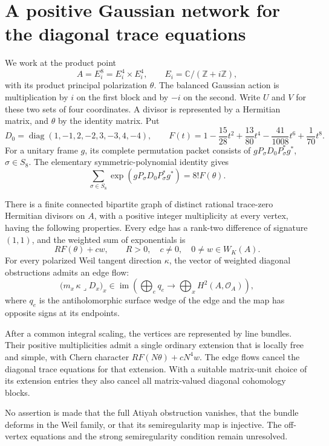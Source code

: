\section{A positive Gaussian network for the diagonal trace equations}
\label{sec:gaussian-trace-network}

We work at the product point
\[
 A=E_i^8=E_i^4\times E_i^4,
 \qquad E_i=\mathbb C/(\mathbb Z+i\mathbb Z),
\]
with its product principal polarization \(\theta\).  The balanced
Gaussian action is multiplication by \(i\) on the first block and by
\(-i\) on the second.  Write \(U\) and \(V\) for these two sets of four
coordinates.  A divisor is represented by a Hermitian matrix, and
\(\theta\) by the identity matrix.  Put
\[
 D_0=\operatorname{diag}(1,-1,2,-2,3,-3,4,-4),\qquad
 F(t)=1-\frac{15}{28}t^2+\frac{13}{80}t^4
       -\frac{41}{1008}t^6+\frac1{70}t^8.
\]
For a unitary frame \(g\), its complete permutation packet consists
of \(gP_\sigma D_0P_\sigma^*g^*\), \(\sigma\in S_8\).
The elementary symmetric-polynomial identity gives
\begin{equation}
 \sum_{\sigma\in S_8}
   \exp(gP_\sigma D_0P_\sigma^*g^*)=8!F(\theta).
 \label{eq:trace-packet-average}
\end{equation}

\begin{theorem}
\label{thm:gaussian-positive-trace-network}
There is a finite connected bipartite graph of distinct rational
trace-zero Hermitian divisors on \(A\), with a positive integer
multiplicity at every vertex, having the following properties.
Every edge has a rank-two difference of signature \((1,1)\), and
the weighted sum of exponentials is
\[
 R F(\theta)+c w,
 \qquad R>0,\quad c\ne0,\quad 0\ne w\in W_K(A).
\]
For every polarized Weil tangent direction \(\kappa\), the vector of
weighted diagonal obstructions admits an edge flow:
\begin{equation}
 \bigl(m_x\,\kappa\mathbin{\lrcorner}D_x\bigr)_x
 \in\operatorname{im}\left(
   \bigoplus_{e}q_e\longrightarrow\bigoplus_x H^2(A,\mathcal O_A)
 \right),
 \label{eq:positive-trace-flow}
\end{equation}
where \(q_e\) is the antiholomorphic surface wedge of the edge and
the map has opposite signs at its endpoints.

After a common integral scaling, the vertices are represented by
line bundles.  Their positive multiplicities admit a single ordinary
extension that is locally free and simple, with Chern character
\(R F(N\theta)+cN^4w\).  The edge flows cancel the diagonal trace
equations for that extension.  With a suitable matrix-unit choice of
its extension entries they also cancel all matrix-valued diagonal
cohomology blocks.

No assertion is made that the full Atiyah obstruction vanishes, that
the bundle deforms in the Weil family, or that its semiregularity map
is injective.  The off-vertex equations and the strong
semiregularity condition remain unresolved.
\end{theorem}

